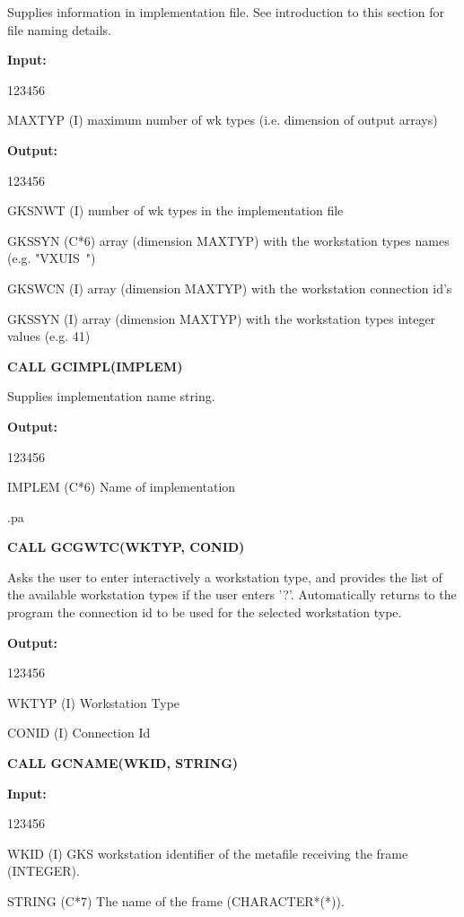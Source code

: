 \begin{OL}
Supplies information in implementation file.
See introduction to this section for file naming details.
 
{\bf Input:}
\begin{DLtt}{123456}
\item[MAXTYP (I)]maximum number of wk types
(i.e. dimension of output arrays)
\end{DLtt}
 
{\bf Output:}
\begin{DLtt}{123456}
\item[GKSNWT (I)]number of wk types in the implementation file
\item[GKSSYN (C*6)]array (dimension MAXTYP) with the workstation types names
(e.g. "VXUIS~")
\item[GKSWCN (I)]array (dimension MAXTYP) with the workstation connection id's
\item[GKSSYN (I)]array (dimension MAXTYP) with the workstation types integer
values (e.g. 41)
\end{DLtt}
\item {\bf CALL GCIMPL(IMPLEM)}
 
Supplies implementation name string.
 
{\bf Output:}
\begin{DLtt}{123456}
\item[IMPLEM (C*6)]Name of implementation
\end{DLtt}
.pa
\item {\bf CALL GCGWTC(WKTYP, CONID)}
 
Asks the user to enter interactively a workstation type, and
provides the list of the available workstation types if the user enters '?'.
Automatically returns to the program the connection id to be used
for the selected workstation type.
 
{\bf Output:}
\begin{DLtt}{123456}
\item[WKTYP (I)]Workstation Type
\item[CONID (I)]Connection Id
\end{DLtt}
\item {\bf CALL GCNAME(WKID, STRING)}
 
{\bf Input:}
\begin{DLtt}{123456}
\item[WKID (I)]GKS workstation identifier of the metafile
receiving the frame (INTEGER).
\item[STRING (C*7)]The name of the frame (CHARACTER*(*)).
\end{DLtt}
 

\end{OL}
